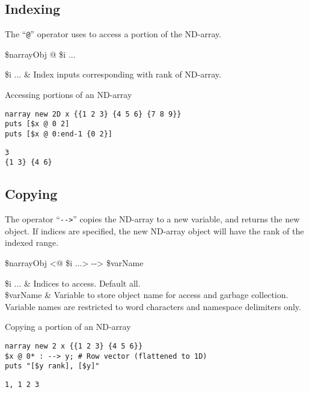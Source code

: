 \clearpage
\subsection{Indexing}
The ``\texttt{@}'' operator uses  to access a portion of the ND-array. 
\begin{syntax}
 \$narrayObj @ \$i ...
\end{syntax}
\begin{args}
\$i ... & Index inputs corresponding with rank of ND-array. \\
\end{args}

\begin{example}{Accessing portions of an ND-array}
\begin{lstlisting}
narray new 2D x {{1 2 3} {4 5 6} {7 8 9}}
puts [$x @ 0 2]
puts [$x @ 0:end-1 {0 2}]
\end{lstlisting}
\tcblower
\begin{lstlisting}
3
{1 3} {4 6}
\end{lstlisting}
\end{example}

\subsection{Copying}
The operator ``\texttt{-{}->}'' copies the ND-array to a new variable, and returns the new object.
If indices are specified, the new ND-array object will have the rank of the indexed range.
\begin{syntax}
 \$narrayObj <@ \$i ...> -{}-> \$varName
\end{syntax}
\begin{args}
\$i ... & Indices to access. Default all. \\
\$varName & Variable to store object name for access and garbage collection. 
Variable names are restricted to word characters and namespace delimiters only.
\end{args}

\begin{example}{Copying a portion of an ND-array}
\begin{lstlisting}
narray new 2 x {{1 2 3} {4 5 6}}
$x @ 0* : --> y; # Row vector (flattened to 1D)
puts "[$y rank], [$y]"
\end{lstlisting}
\tcblower
\begin{lstlisting}
1, 1 2 3
\end{lstlisting}
\end{example}
\clearpage
